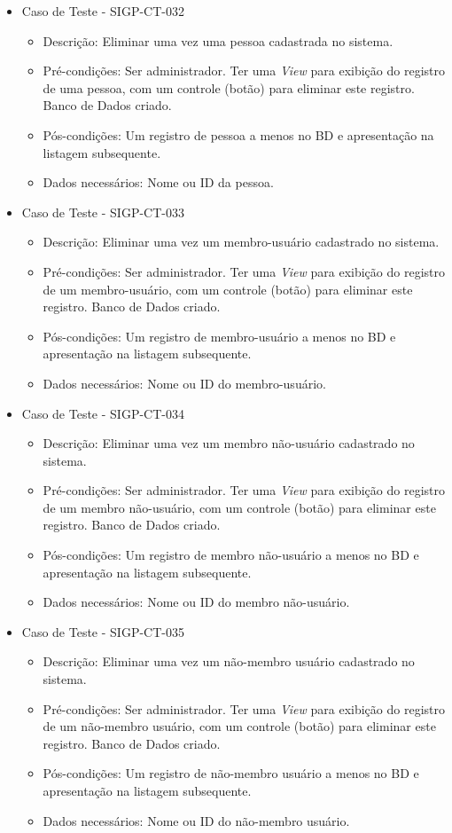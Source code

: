 \documentclass[11pt, a4paper]{book}
\begin{document}
\begin{itemize}
	\item Caso de Teste - SIGP-CT-032
	\begin{itemize}
	\item Descrição: Eliminar uma vez uma pessoa cadastrada no sistema.
	\item Pré-condições: Ser administrador. Ter uma \emph{View} para exibição do registro de uma pessoa, com um controle (botão) para eliminar este registro. Banco de Dados criado.
	\item Pós-condições: Um registro de pessoa a menos no BD e apresentação na listagem subsequente.
	\item Dados necessários: Nome ou ID da pessoa.
	\end{itemize}

	\item Caso de Teste - SIGP-CT-033
	\begin{itemize}
	\item Descrição: Eliminar uma vez um membro-usuário cadastrado no sistema.
	\item Pré-condições: Ser administrador. Ter uma \emph{View} para exibição do registro de um membro-usuário, com um controle (botão) para eliminar este registro. Banco de Dados criado.
	\item Pós-condições: Um registro de membro-usuário a menos no BD e apresentação na listagem subsequente.
	\item Dados necessários: Nome ou ID do membro-usuário.
	\end{itemize}

	\item Caso de Teste - SIGP-CT-034
	\begin{itemize}
	\item Descrição: Eliminar uma vez um membro não-usuário cadastrado no sistema.
	\item Pré-condições: Ser administrador. Ter uma \emph{View} para exibição do registro de um membro não-usuário, com um controle (botão) para eliminar este registro. Banco de Dados criado.
	\item Pós-condições: Um registro de membro não-usuário a menos no BD e apresentação na listagem subsequente.
	\item Dados necessários: Nome ou ID do membro não-usuário.
	\end{itemize}

	\item Caso de Teste - SIGP-CT-035
	\begin{itemize}
	\item Descrição: Eliminar uma vez um não-membro usuário cadastrado no sistema.
	\item Pré-condições: Ser administrador. Ter uma \emph{View} para exibição do registro de um não-membro usuário, com um controle (botão) para eliminar este registro. Banco de Dados criado.
	\item Pós-condições: Um registro de não-membro usuário a menos no BD e apresentação na listagem subsequente.
	\item Dados necessários: Nome ou ID do não-membro usuário.
	\end{itemize}


\end{itemize}
\end{document}
